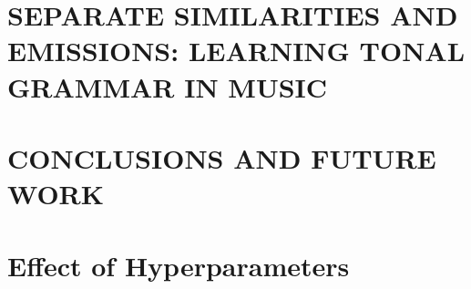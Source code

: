 \documentclass[final]{ua-thesis}
\begin{document}
\chapter{\MakeUppercase{Separate Similarities and Emissions: Learning
  Tonal Grammar in Music}}
\label{chapter:music}


\chapter{\MakeUppercase{Conclusions and Future Work}}
\label{chapter:discussion}


\appendix
\chapter{Effect of Hyperparameters}
\label{appendix:hyperparameters}




\end{document}
